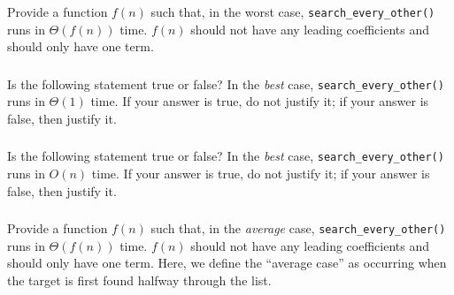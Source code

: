 \documentclass{article}
\begin{document}
\subsubsection{}

Provide a function $f(n)$ such that, in the worst case, \lstinline{search_every_other()} runs in $\Theta(f(n))$ time. $f(n)$ should not have any leading coefficients and should only have one term.

\begin{mdframed}
\vspace{3em}
\end{mdframed}

\subsubsection{}

Is the following statement true or false? In the \textit{best} case, \lstinline{search_every_other()} runs in $\Theta(1)$ time. If your answer is true, do not justify it; if your answer is false, then justify it.

\begin{mdframed}
\vspace{3em}
\end{mdframed}

\subsubsection{}

Is the following statement true or false? In the \textit{best} case, \lstinline{search_every_other()} runs in $O(n)$ time. If your answer is true, do not justify it; if your answer is false, then justify it.

\begin{mdframed}
\vspace{3em}
\end{mdframed}

\subsubsection{}

Provide a function $f(n)$ such that, in the \textit{average} case, \lstinline{search_every_other()} runs in $\Theta(f(n))$ time. $f(n)$ should not have any leading coefficients and should only have one term. Here, we define the ``average case'' as occurring when the target is first found halfway through the list.
\end{document}
